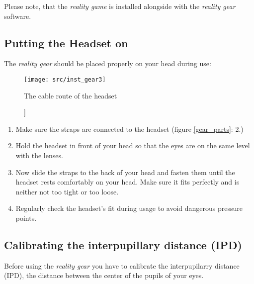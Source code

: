 Please note, that the \emph{\poke{} reality game} is installed alongside with the \emph{\poke{} reality gear} software.

\subsection{Putting the Headset on}
The \emph{\poke{} reality gear} should be placed properly on your head during use:
\begin{figure}[!ht]
\begin{center}
\texttt{[image: src/inst\_gear3]}
\end{center}
\caption]{The cable route of the headset}
\label{gear_cable}
\end{figure}
\begin{enumerate}
\item Make sure the straps are connected to the headset (figure \ref{gear_parts}: 2.)
\item Hold the headset in front of your head so that the eyes are on the same level with the lenses.
\item Now slide the straps to the back of your head and fasten them until the headset rests comfortably on your head. Make sure it fits perfectly and is neither not too tight or too loose.
\item Regularly check the headset's fit during usage to avoid dangerous pressure points.
\end{enumerate}

\subsection{Calibrating the interpupillary distance (IPD)}

Before using the \emph{\poke{} reality gear} you have to calibrate the interpupilarry distance (IPD), the distance between the center of the pupils of your eyes.

